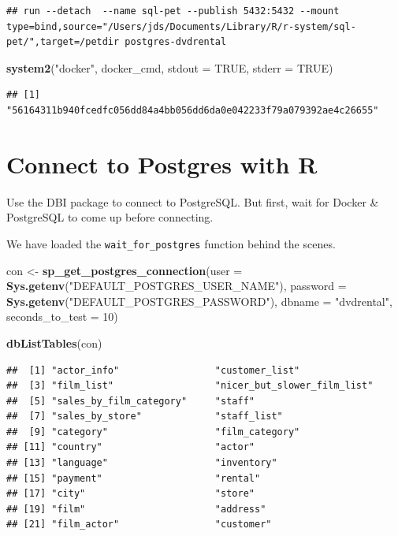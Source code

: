 \documentclass[]{book}
\newenvironment{Shaded}{\begin{snugshade}}{\end{snugshade}}
\newcommand{\DataTypeTok}[1]{\textcolor[rgb]{0.13,0.29,0.53}{#1}}
\newcommand{\DecValTok}[1]{\textcolor[rgb]{0.00,0.00,0.81}{#1}}
\newcommand{\KeywordTok}[1]{\textcolor[rgb]{0.13,0.29,0.53}{\textbf{#1}}}
\newcommand{\NormalTok}[1]{#1}
\newcommand{\OtherTok}[1]{\textcolor[rgb]{0.56,0.35,0.01}{#1}}
\newcommand{\StringTok}[1]{\textcolor[rgb]{0.31,0.60,0.02}{#1}}
\theoremstyle{definition}
\theoremstyle{definition}
\theoremstyle{definition}
\theoremstyle{remark}
\begin{document}
\begin{verbatim}
## run --detach  --name sql-pet --publish 5432:5432 --mount type=bind,source="/Users/jds/Documents/Library/R/r-system/sql-pet/",target=/petdir postgres-dvdrental
\end{verbatim}

\begin{Shaded}
\begin{Highlighting}[]
\KeywordTok{system2}\NormalTok{(}\StringTok{"docker"}\NormalTok{, docker_cmd, }\DataTypeTok{stdout =} \OtherTok{TRUE}\NormalTok{, }\DataTypeTok{stderr =} \OtherTok{TRUE}\NormalTok{)}
\end{Highlighting}
\end{Shaded}

\begin{verbatim}
## [1] "56164311b940fcedfc056dd84a4bb056dd6da0e042233f79a079392ae4c26655"
\end{verbatim}

\hypertarget{connect-to-postgres-with-r}{%
\section{Connect to Postgres with R}\label{connect-to-postgres-with-r}}

Use the DBI package to connect to PostgreSQL. But first, wait for Docker
\& PostgreSQL to come up before connecting.

We have loaded the \texttt{wait\_for\_postgres} function behind the
scenes.

\begin{Shaded}
\begin{Highlighting}[]
\NormalTok{con <-}\StringTok{ }\KeywordTok{sp_get_postgres_connection}\NormalTok{(}\DataTypeTok{user =} \KeywordTok{Sys.getenv}\NormalTok{(}\StringTok{"DEFAULT_POSTGRES_USER_NAME"}\NormalTok{),}
                         \DataTypeTok{password =} \KeywordTok{Sys.getenv}\NormalTok{(}\StringTok{"DEFAULT_POSTGRES_PASSWORD"}\NormalTok{),}
                         \DataTypeTok{dbname =} \StringTok{"dvdrental"}\NormalTok{,}
                         \DataTypeTok{seconds_to_test =} \DecValTok{10}\NormalTok{)}

\KeywordTok{dbListTables}\NormalTok{(con)}
\end{Highlighting}
\end{Shaded}

\begin{verbatim}
##  [1] "actor_info"                 "customer_list"             
##  [3] "film_list"                  "nicer_but_slower_film_list"
##  [5] "sales_by_film_category"     "staff"                     
##  [7] "sales_by_store"             "staff_list"                
##  [9] "category"                   "film_category"             
## [11] "country"                    "actor"                     
## [13] "language"                   "inventory"                 
## [15] "payment"                    "rental"                    
## [17] "city"                       "store"                     
## [19] "film"                       "address"                   
## [21] "film_actor"                 "customer"
\end{verbatim}
\end{document}
